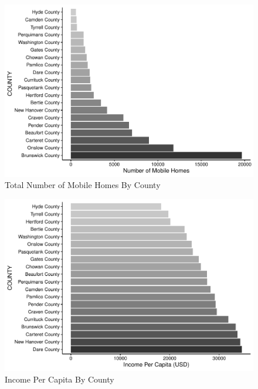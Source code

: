 \documentclass[
  12pt,
]{article}
\begin{document}
\begin{figure}
\centering
\includegraphics{Alexander_ENV872_Project_files/figure-latex/bar chart3-1.pdf}
\caption{Total Number of Mobile Homes By County}
\end{figure}

\begin{figure}
\centering
\includegraphics{Alexander_ENV872_Project_files/figure-latex/bar chart4-1.pdf}
\caption{Income Per Capita By County}
\end{figure}
\end{document}
